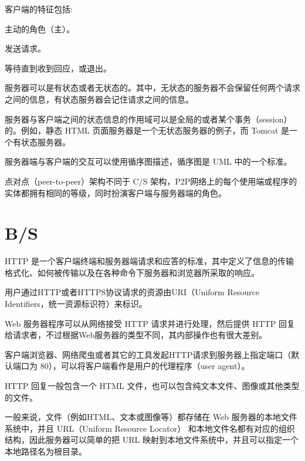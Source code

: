 客户端的特征包括:

\begin{compactitem}
\item 主动的角色（主）。
\item 发送请求。
\item 等待直到收到回应，或退出。
\end{compactitem}

服务器可以是有状态或者无状态的。其中，无状态的服务器不会保留任何两个请求之间的信息，有状态服务器会记住请求之间的信息。

服务器与客户端之间的状态信息的作用域可以是全局的或者某个事务（session）的。例如，静态 HTML 页面服务器是一个无状态服务器的例子，而 Tomcat 是一个有状态服务器。



服务器端与客户端的交互可以使用循序图描述，循序图是 UML 中的一个标准。

点对点（peer-to-peer）架构不同于 C/S 架构，P2P网络上的每个使用端或程序的实体都拥有相同的等级，同时扮演客户端与服务器端的角色。





\section{B/S}

HTTP 是一个客户端终端和服务器端请求和应答的标准，其中定义了信息的传输格式化、如何被传输以及在各种命令下服务器和浏览器所采取的响应。

用户通过HTTP或者HTTPS协议请求的资源由URI（Uniform Resource Identifiers，统一资源标识符）来标识。

Web 服务器程序可以从网络接受 HTTP 请求并进行处理，然后提供 HTTP 回复给请求者，不过根据Web服务器的类型不同，其内部操作也有很大差别。

\begin{compactitem}
\item 客户端浏览器、网络爬虫或者其它的工具发起HTTP请求到服务器上指定端口（默认端口为 80），可以将客户端看作是用户的代理程序（user agent）。
\item HTTP 回复一般包含一个 HTML 文件，也可以包含纯文本文件、图像或其他类型的文件。
\end{compactitem}




一般来说，文件（例如HTML、文本或图像等）都存储在 Web 服务器的本地文件系统中，并且 URL（Uniform Resource Locator） 和本地文件名都有对应的组织结构，因此服务器可以简单的把 URL 映射到本地文件系统中，并且可以指定一个本地路径名为根目录。

